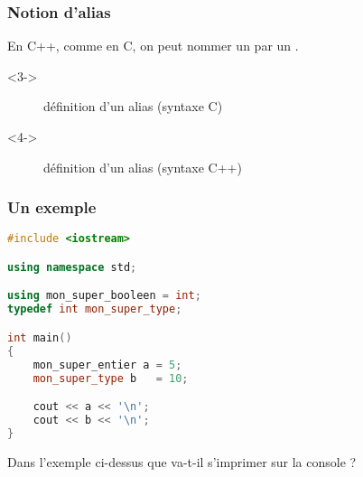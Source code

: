 \documentclass{cppcourses}
\begin{document}
\begin{frame}

\frametitle{Notion d'alias}

En C++, comme en C, on peut nommer un \mykeyword{\textcolor{red}{type}} par un \mykeyword{\textcolor{blue}{autre type}}.


\begin{uncoverenv}<3->

\begin{figure}
\caption{définition d'un alias (syntaxe C)}
\end{figure}

\end{uncoverenv}

\begin{uncoverenv}<4->

\begin{figure}
\caption{définition d'un alias (syntaxe C++)}
\end{figure}

\end{uncoverenv}

\end{frame}

\begin{frame}[fragile]

\frametitle{Un exemple}

\begin{example}

\begin{lstlisting}[language = c++]
#include <iostream>

using namespace std;

using mon_super_booleen = int;
typedef int mon_super_type;

int main()
{
    mon_super_entier a = 5;
    mon_super_type b   = 10;

    cout << a << '\n';
    cout << b << '\n';
}
\end{lstlisting}

Dans l'exemple ci-dessus que va-t-il s'imprimer sur la console ?


\end{example}

\end{frame}
\end{document}
